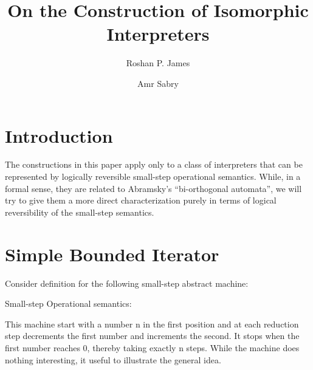 \documentclass{llncs}
\begin{document}
\title{On the Construction of Isomorphic Interpreters} 
\author{Roshan P. James \and Amr Sabry}
\maketitle

\begin{abstract}
\end{abstract}

\section{Introduction} 

The constructions in this paper apply only to a class of interpreters
that can be represented by logically reversible small-step operational
semantics. While, in a formal sense, they are related to Abramsky's
``bi-orthogonal automata''\cite{abramsky2005structural}, we will try
to give them a more direct characterization purely in terms of logical
reversibility of the small-step semantics.


\section{Simple Bounded Iterator}
Consider definition for the following small-step abstract machine:

%

Small-step Operational semantics:


This machine start with a number {{n}} in the first position and at
each reduction step decrements the first number and increments the
second. It stops when the first number reaches 0, thereby taking
exactly {{n}} steps. While the machine does nothing interesting,
it useful to illustrate the general idea.
\end{document}
